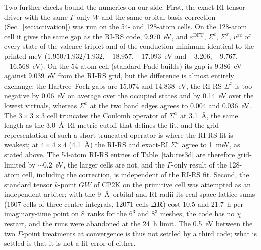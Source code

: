 \documentclass[%
 reprint,
superscriptaddress,
 amsmath,amssymb,
 aps,
prb,
]{revtex4-2}
\newcommand{\bR}{\mathbf{R}}
\begin{document}
Two further checks bound the numerics on our side. First, the exact-RI tensor driver with the
same $\Gamma$-only $W$ and the same orbital-basis correction (Sec.~\ref{sec:activation}) was
run on the 54- and 128-atom cells. On the 128-atom cell it gives the same gap as the RI-RS
code, 9.970~eV, and $\varepsilon^\mathrm{DFT}$, $\Sigma^c$, $\Sigma^x$, $v^{xc}$ of every
state of the valence triplet and of the conduction minimum identical to the printed meV
($1.950/1.932/1.932$, $-18.957$, $-17.093$~eV and $-3.206$, $-9.767$, $-16.568$~eV). On the
54-atom cell (standard-Pad\'e builds) its gap is 9.386~eV against 9.039~eV from the RI-RS
grid, but the difference is almost entirely exchange: the Hartree--Fock gaps are 15.074 and 14.838~eV, the
RI-RS $\Sigma^x$ is too negative by 0.06~eV on average over the occupied states and by 0.14~eV
over the lowest virtuals, whereas $\Sigma^c$ at the two band edges agrees to 0.004 and
0.036~eV. The $3\times3\times3$ cell truncates the Coulomb operator of $\Sigma^x$ at 3.1~\AA,
the same length as the 3.0~\AA\ RI-metric cutoff that defines the fit, and the grid
representation of such a short truncated operator is where the RI-RS fit is weakest; at
$4\times4\times4$ (4.1~\AA) the RI-RS and exact-RI $\Sigma^x$ agree to 1~meV, as stated
above. The 54-atom RI-RS entries of Table~\ref{tab:res3d} are therefore grid-limited by
$\sim0.2$~eV, the larger cells are not, and the $\Gamma$-only result of the 128-atom cell,
including the correction, is independent of the RI-RS fit. Second, the standard tensor $k$-point $GW$ of CP2K on the primitive
cell was attempted as an independent arbiter; with the 9~\AA\ orbital and RI radii its
real-space lattice sums (1607 cells of three-centre integrals, 12071 cells $\Delta\bR$)
cost 10.5 and 21.7~h per imaginary-time point on 8 ranks for the $6^3$ and $8^3$ meshes,
the code has no $\chi$ restart, and the runs were abandoned at the 24~h limit. The 0.5~eV
between the two $\Gamma$-point treatments at convergence is thus not settled by a third
code; what is settled is that it is not a fit error of either.
\end{document}

